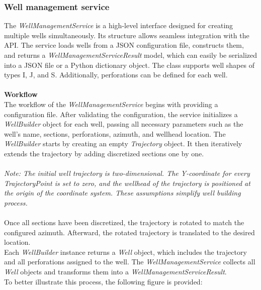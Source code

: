 \subsubsection{Well management service}


The \textit{WellManagementService} is a high-level interface designed for creating multiple wells simultaneously. Its structure allows seamless integration with the API.
The service loads wells from a JSON configuration file, constructs them, and returns a \textit{WellManagementServiceResult} model, which can easily be serialized into a JSON file or a Python dictionary object. The class supports well shapes of types I, J, and S. Additionally, perforations can be defined for each well.\\\\
\textbf{Workflow}\\
The workflow of the \textit{WellManagementService} begins with providing a configuration file. After validating the configuration, the service initializes a \textit{WellBuilder} object for each well, passing all necessary parameters such as the well's name, sections, perforations, azimuth, and wellhead location.
The \textit{WellBuilder} starts by creating an empty \textit{Trajectory} object. It then iteratively extends the trajectory by adding discretized sections one by one.\\\\
\textit{Note: The initial well trajectory is two-dimensional. The Y-coordinate for every \textit{TrajectoryPoint} is set to zero, and the wellhead of the trajectory is positioned at the origin of the coordinate system. These assumptions simplify well building process.}\\\\
Once all sections have been discretized, the trajectory is rotated to match the configured azimuth. Afterward, the rotated trajectory is translated to the desired location.\\
Each \textit{WellBuilder} instance returns a \textit{Well} object, which includes the trajectory and all perforations assigned to the well. The \textit{WellManagementService} collects all \textit{Well} objects and transforms them into a \textit{WellManagementServiceResult}.\\
To better illustrate this process, the following figure is provided:\\

